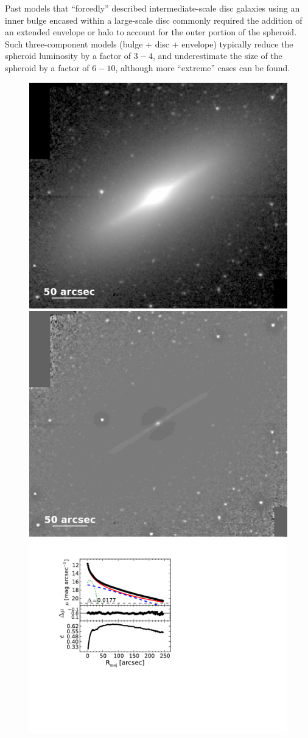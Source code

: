 \documentclass[useAMS,usenatbib,article]{mnras}
\begin{document}
Past models that ``forcedly'' described intermediate-scale disc galaxies using an inner bulge 
encased within a large-scale disc 
commonly required the addition of an extended envelope or halo to account for the outer portion of the spheroid. 
Such three-component models (bulge + disc + envelope) typically reduce the spheroid luminosity by a factor of $3-4$, 
and underestimate the size of the spheroid by a factor of $6-10$, 
although more ``extreme'' cases can be found. 


\begin{figure}
\begin{center}
\includegraphics[width=0.49\columnwidth]{n3115_image.jpeg}
\includegraphics[width=0.49\columnwidth]{n3115_unsharp.jpeg} \\
\includegraphics[width=1.05\columnwidth]{n3115_decomposition.pdf}

\end{center}
\end{figure}
\end{document}
